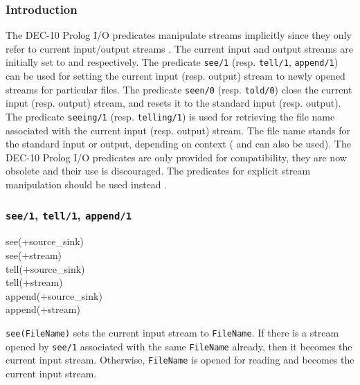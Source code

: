 \subsubsection{Introduction}
The DEC-10 Prolog I/O predicates manipulate streams implicitly since they
only refer to current input/output streams .
The current input and output streams are initially set to
 and  respectively. The predicate
\texttt{see/1}
(resp. \texttt{tell/1}, \texttt{append/1}) can be used for setting the
current input (resp. output) stream to newly opened streams for
particular files. The predicate \texttt{seen/0}
(resp. \texttt{told/0}) close the current input (resp. output) stream,
and resets it to the standard input (resp. output). The predicate
\texttt{seeing/1} (resp. \texttt{telling/1}) is used for retrieving
the file name associated with the current input (resp. output)
stream. The file name  stands for the standard input or
output, depending on context ( and
 can also be used). The DEC-10 Prolog I/O predicates
are only provided for compatibility, they are now obsolete and
their use is discouraged. The predicates for explicit stream manipulation
should be used instead .

\subsubsection{\texttt{see/1},
               \texttt{tell/1},
               \texttt{append/1}}

\begin{TemplatesOneCol}
see(+source\_sink)\\
see(+stream)\\
tell(+source\_sink)\\
tell(+stream)\\
append(+source\_sink)\\
append(+stream)

\end{TemplatesOneCol}

\Description

\texttt{see(FileName)} sets the current input stream to \texttt{FileName}.
If there is a stream opened by \texttt{see/1} associated with the same
\texttt{FileName} already, then it becomes the current input stream.
Otherwise, \texttt{FileName} is opened for reading and becomes the current
input stream.

